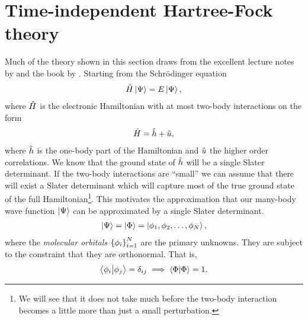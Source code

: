     \section{Time-independent Hartree-Fock theory}
        Much of the theory shown in this section draws from the excellent
        lecture notes by \citeauthor{kvaal2017notes} \cite{kvaal2017notes} and
        the book  by \citeauthor{szabo1996modern}
        \cite{szabo1996modern}.
        Starting from the Schrödinger equation
        \begin{align}
            \hat{H}\ket{\Psi} = E\ket{\Psi},
        \end{align}
        where $\hat{H}$ is the electronic Hamiltonian with at most two-body
        interactions on the form
        \begin{align}
            \hat{H} = \hat{h} + \hat{u},
        \end{align}
        where $\hat{h}$ is the one-body part of the Hamiltonian and
        $\hat{u}$ the higher order correlations.
        We know that the ground state of $\hat{h}$ will be a single Slater
        determinant.
        If the two-body interactions are ``small'' we can assume that there will
        exist a Slater determinant which will capture most of the true ground
        state of the full Hamiltonian\footnote{We will see that it does not take
        much before the two-body interaction becomes a little more than just a
        small perturbation.}.
        This motivates the approximation that our many-body wave function
        $\ket{\Psi}$ can be approximated by a single Slater determinant.
        \begin{align}
            \ket{\Psi} = \ket{\Phi} = \ket{\phi_1, \phi_2, \dots, \phi_N},
        \end{align}
        where the \emph{molecular orbitals} $\left\{ \phi_i \right\}_{i = 1}^{N}$ are the
        primary unknowns.
        They are subject to the constraint that they are orthonormal.
        That is,
        \begin{align}
            \braket{\phi_i}{\phi_j} = \delta_{ij}
            \implies \braket{\Phi}{\Phi} = 1.
        \end{align}

